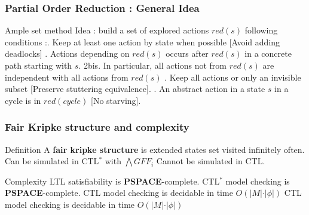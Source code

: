 \documentclass[pdf]{beamer}
\begin{document}
\begin{frame}
\frametitle{Partial Order Reduction : General Idea}
\begin{exampleblock}{Ample set method}
Idea : build a set of explored actions $red(s)$ following conditions :. Keep at least one action by state when possible [Avoid adding deadlocks] . Actions depending on $red(s)$ occurs after $red(s)$ in a concrete path starting with $s$. \newline
2bis. In particular, all actions not from $red(s)$ are independent with all actions from $red(s)$ . Keep all actions or only an invisible subset [Preserve stuttering equivalence]. . An abstract action in a state $s$ in a cycle is in $red(cycle)$ [No starving]. \newline	
\end{exampleblock}
\end{frame}


\begin{frame}
\frametitle{Fair Kripke structure and complexity}
\begin{block}{Definition}
A  \textbf{fair kripke structure} is extended states set visited infinitely often. \newline	
Can be simulated in CTL$^*$ with $\bigwedge GF F_i$ \newline
Cannot be simulated in CTL. \newline

\end{block}

\begin{alertblock}{Complexity}
LTL satisfiability is \textbf{PSPACE}-complete. \newline
CTL$^*$ model checking is \textbf{PSPACE}-complete. \newline
CTL model checking is decidable in time $O(\vert M \vert \cdot \vert \phi \vert)$
CTL model checking is decidable in time $O(\vert M \vert \cdot \vert \phi \vert)$
\end{alertblock}

\end{frame}
\end{document}
